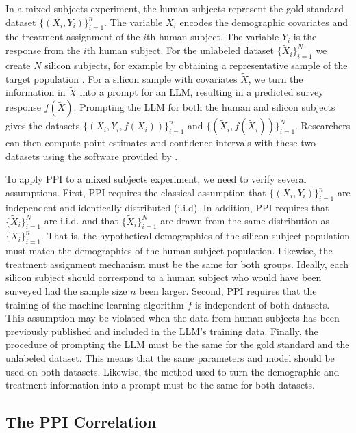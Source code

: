 \documentclass{article}
\begin{document}
In a mixed subjects experiment, the human subjects represent the gold standard dataset $\{(X_i, Y_i)\}_{i=1}^n$. The variable $X_i$ encodes the demographic covariates and the treatment assignment of the $i$th human subject. The variable $Y_i$ is the response from the $i$th human subject. For the unlabeled dataset $\{\widetilde{X}_i\}_{i=1}^N$ we create $N$ silicon subjects, for example by obtaining a representative sample of the target population \citep{argyle_out_2023}. For a silicon sample with covariates $\widetilde{X}$, we turn the information in $\widetilde{X}$ into a prompt for an LLM, resulting in a predicted survey response $f(\widetilde{X})$. Prompting the LLM for both the human and silicon subjects gives the datasets $\{(X_i, Y_i, f(X_i))\}_{i=1}^n$ and $\{(\widetilde{X}_i, f(\widetilde{X}_i))\}_{i=1}^N$. Researchers can then compute point estimates and confidence intervals with these two datasets using the software provided by \citet{angelopoulos_prediction-powered_2023-1, angelopoulos2024ppi}.

To apply PPI to a mixed subjects experiment, we need to verify several assumptions. First, PPI requires the classical assumption that $\{(X_i,Y_i)\}_{i=1}^n$ are independent and identically distributed (i.i.d). In addition, PPI requires that $\{\widetilde{X}_i\}_{i=1}^N$ are i.i.d. and that $\{ \widetilde{X}_i\}_{i=1}^N$ are drawn from the same distribution as $\{X_i\}_{i=1}^n$. That is, the hypothetical demographics of the silicon subject population must match the demographics of the human subject population.  Likewise, the treatment assignment mechanism must be the same for both groups. Ideally, each silicon subject should correspond to a human subject who would have been surveyed had the sample size $n$ been larger.
Second, PPI requires that the training of the machine learning algorithm $f$ is independent of both datasets. This assumption may be violated when the data from human subjects has been previously published and included in the LLM's training data. Finally, the procedure of prompting the LLM must be the same for the gold standard and the unlabeled dataset. This means that the same parameters and model should be used on both datasets. Likewise, the method used to turn the demographic and treatment information into a prompt must be the same for both datasets.

\subsection{The PPI Correlation}
\end{document}
